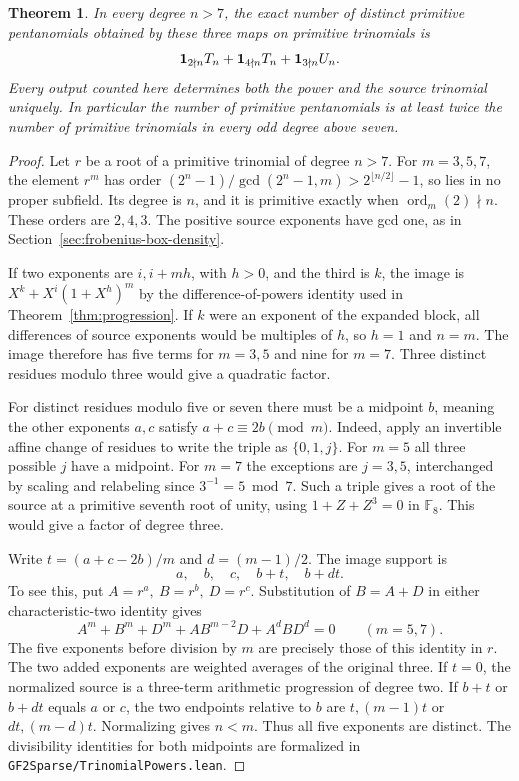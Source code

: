 \documentclass[11pt]{article}
\newtheorem{theorem}{Theorem}
\begin{document}
\begin{theorem}
In every degree \(n>7\), the exact number of distinct primitive
pentanomials obtained by these three maps on primitive trinomials is
\[
     {\bf1}_{2\nmid n} T_n + {\bf1}_{4\nmid n} T_n
           + {\bf1}_{3\nmid n} U_n .
\]
Every output counted here determines both the power and the source
trinomial uniquely. In particular the number of primitive pentanomials
is at least twice the number of primitive trinomials in every odd
degree above seven.
\end{theorem}
\begin{proof}
Let \(r\) be a root of a primitive trinomial of degree \(n>7\). For
\(m=3,5,7\), the element \(r^m\) has order
\((2^n-1)/\gcd(2^n-1,m)>2^{\lfloor n/2\rfloor}-1\), so lies in no
proper subfield. Its degree is \(n\), and it is primitive exactly when
\(\operatorname{ord}_m(2)\nmid n\). These orders are \(2,4,3\).
The positive source exponents have gcd one, as in
Section~\ref{sec:frobenius-box-density}.

If two exponents are \(i,i+mh\), with \(h>0\), and the third is \(k\),
the image is \(X^k+X^i(1+X^h)^m\) by the difference-of-powers
identity used in Theorem~\ref{thm:progression}. If \(k\) were an exponent of the expanded
block, all differences of source exponents would be multiples of
\(h\), so \(h=1\) and \(n=m\). The image therefore has five terms
for \(m=3,5\) and nine for \(m=7\). Three distinct residues modulo
three would give a quadratic factor.

For distinct residues modulo five or seven there must be a midpoint
\(b\), meaning the other exponents \(a,c\) satisfy
\(a+c\equiv 2b\pmod m\). Indeed, apply an invertible affine change
of residues to write the triple as \(\{0,1,j\}\). For \(m=5\) all
three possible \(j\) have a midpoint. For \(m=7\) the exceptions
are \(j=3,5\), interchanged by scaling and relabeling since
\(3^{-1}=5\bmod7\). Such a triple gives a root of the source at a
primitive seventh root of unity, using \(1+Z+Z^3=0\) in
\(\mathbb F_8\). This would give a factor of degree three.

Write \(t=(a+c-2b)/m\) and \(d=(m-1)/2\). The image support is
\[
                   a,\quad b,\quad c,\quad b+t,\quad b+dt .
\]
To see this, put \(A=r^a,\ B=r^b,\ D=r^c\). Substitution of \(B=A+D\)
in either characteristic-two identity gives
\[
     A^m+B^m+D^m+AB^{m-2}D+A^d B D^d=0 \qquad(m=5,7).
\]
The five exponents before division by \(m\) are precisely those of
this identity in \(r\). The two added exponents are weighted averages
of the original three. If \(t=0\), the normalized source is a
three-term arithmetic progression of degree two. If \(b+t\) or
\(b+dt\) equals \(a\) or \(c\), the two endpoints relative to \(b\)
are \(t,(m-1)t\) or \(dt,(m-d)t\). Normalizing gives \(n<m\).
Thus all five exponents are distinct. The divisibility identities
for both midpoints are formalized in
\nolinkurl{GF2Sparse/TrinomialPowers.lean}.


\end{proof}
\end{document}
